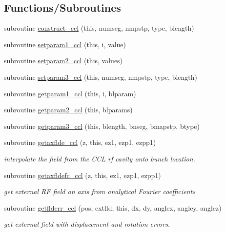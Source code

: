 \subsection*{Functions/\+Subroutines}
\begin{DoxyCompactItemize}
\item 
subroutine \mbox{\hyperlink{namespacecclclass_af38d062f04c18827d1d2a76c17039c58}{construct\+\_\+ccl}} (this, numseg, nmpstp, type, blength)
\item 
subroutine \mbox{\hyperlink{namespacecclclass_adf1829da601e1090ce5f5e5046c4d62c}{setparam1\+\_\+ccl}} (this, i, value)
\item 
subroutine \mbox{\hyperlink{namespacecclclass_a7bc5a807438db526489d8773fa168375}{setparam2\+\_\+ccl}} (this, values)
\item 
subroutine \mbox{\hyperlink{namespacecclclass_a5a90756fe0684d2f29121a368dbef489}{setparam3\+\_\+ccl}} (this, numseg, nmpstp, type, blength)
\item 
subroutine \mbox{\hyperlink{namespacecclclass_a3cb17684a6eef64dd3c35cbb03bcb8b3}{getparam1\+\_\+ccl}} (this, i, blparam)
\item 
subroutine \mbox{\hyperlink{namespacecclclass_ad1c56a9447d1ff854afdc5502ae0fe18}{getparam2\+\_\+ccl}} (this, blparams)
\item 
subroutine \mbox{\hyperlink{namespacecclclass_ad223096667fbe2e53bae56b52b2350fa}{getparam3\+\_\+ccl}} (this, blength, bnseg, bmapstp, btype)
\item 
subroutine \mbox{\hyperlink{namespacecclclass_a881db4a51cdc73a6c489b2814565a243}{getaxflde\+\_\+ccl}} (z, this, ez1, ezp1, ezpp1)
\begin{DoxyCompactList}\small\item\em interpolate the field from the C\+CL rf cavity onto bunch location. \end{DoxyCompactList}\item 
subroutine \mbox{\hyperlink{namespacecclclass_a06d52f7ecb50e977ef5e2330506180d2}{getaxfldefc\+\_\+ccl}} (z, this, ez1, ezp1, ezpp1)
\begin{DoxyCompactList}\small\item\em get external RF field on axis from analytical Fourier coefficients \end{DoxyCompactList}\item 
subroutine \mbox{\hyperlink{namespacecclclass_a4d8386891ff89c7352f001b01d5f84b5}{getflderr\+\_\+ccl}} (pos, extfld, this, dx, dy, anglex, angley, anglez)
\begin{DoxyCompactList}\small\item\em get external field with displacement and rotation errors. \end{DoxyCompactList}\item 

\end{DoxyCompactItemize}
